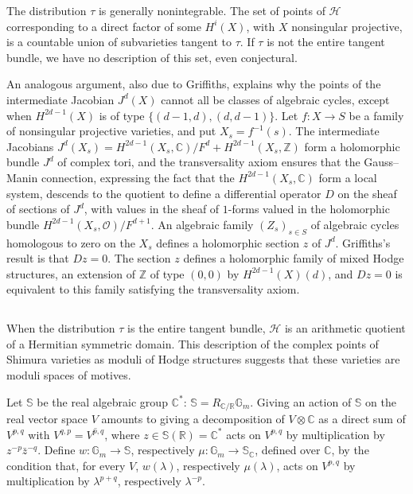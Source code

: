 \documentclass[11pt,a4paper]{article}
\theoremstyle{plain}
\theoremstyle{definition}
\newcommand{\Z}{\mathbb{Z}}
\newcommand{\C}{\mathbb{C}}
\newcommand{\R}{\mathbb{R}}
\begin{document}
The distribution $\tau$ is generally nonintegrable. The set of points of $\mathscr{H}$ corresponding to a direct factor of some $H^i(X)$, with $X$ nonsingular projective, is a countable union of subvarieties tangent to $\tau$. If $\tau$ is not the entire tangent bundle, we have no description of this set, even conjectural.

An analogous argument, also due to Griffiths, explains why the points of the intermediate Jacobian $J^d(X)$ cannot all be classes of algebraic cycles, except when $H^{2d-1}(X)$ is of type $\{(d-1,d),(d,d-1)\}$. Let $f:X\to S$ be a family of nonsingular projective varieties, and put $X_s=f^{-1}(s)$. The intermediate Jacobians $J^d(X_s)=H^{2d-1}(X_s,\C)/F^d+H^{2d-1}(X_s,\Z)$ form a holomorphic bundle $J^d$ of complex tori, and the transversality axiom ensures that the Gauss--Manin connection, expressing the fact that the $H^{2d-1}(X_s,\C)$ form a local system, descends to the quotient to define a differential operator $D$ on the sheaf of sections of $J^d$, with values in the sheaf of $1$-forms valued in the holomorphic bundle $H^{2d-1}(X_s,\mathcal{O})/F^{d+1}$. An algebraic family $(Z_s)_{s\in S}$ of algebraic cycles homologous to zero on the $X_s$ defines a holomorphic section $z$ of $J^d$. Griffiths's result is that $Dz=0$. The section $z$ defines a holomorphic family of mixed Hodge structures, an extension of $\Z$ of type $(0,0)$ by $H^{2d-1}(X)(d)$, and $Dz=0$ is equivalent to this family satisfying the transversality axiom.

\subsection{}

When the distribution $\tau$ is the entire tangent bundle, $\mathscr{H}$ is an arithmetic quotient of a Hermitian symmetric domain. This description of the complex points of Shimura varieties as moduli of Hodge structures suggests that these varieties are moduli spaces of motives.

Let $\mathbb{S}$ be the real algebraic group $\C^*$: $\mathbb{S}=R_{\C/\R}\mathbb{G}_m$. Giving an action of $\mathbb{S}$ on the real vector space $V$ amounts to giving a decomposition of $V\otimes\C$ as a direct sum of $V^{p,q}$ with $V^{q,p}=\overline{V^{p,q}}$, where $z\in\mathbb{S}(\R)=\C^*$ acts on $V^{p,q}$ by multiplication by $z^{-p}\bar z^{-q}$. Define $w:\mathbb{G}_m\to\mathbb{S}$, respectively $\mu:\mathbb{G}_m\to\mathbb{S}_{\C}$, defined over $\C$, by the condition that, for every $V$, $w(\lambda)$, respectively $\mu(\lambda)$, acts on $V^{p,q}$ by multiplication by $\lambda^{p+q}$, respectively $\lambda^{-p}$.
\end{document}
